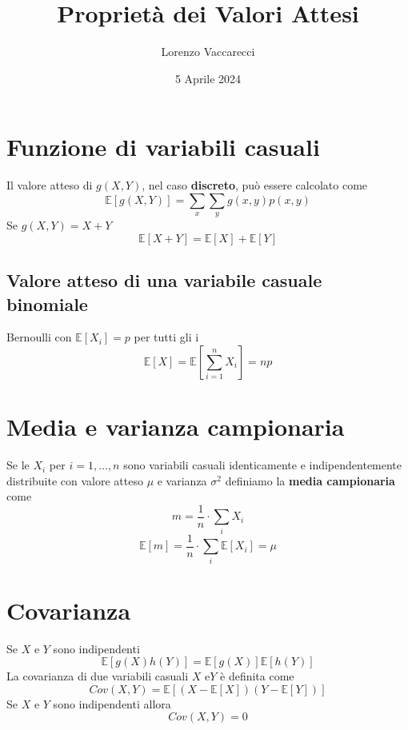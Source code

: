 \documentclass[12pt]{article}
\title{Proprietà dei Valori Attesi}
\author{Lorenzo Vaccarecci}
\date{5 Aprile 2024}
\begin{document}
\maketitle
\section{Funzione di variabili casuali}
Il valore atteso di $g(X,Y)$, nel caso \textbf{discreto}, può essere calcolato come
\begin{equation*}
    \mathbb{E}[g(X,Y)]=\sum_{x}\sum_{y}g(x,y)p(x,y)
\end{equation*}
Se $g(X,Y)=X+Y$
\begin{equation*}
    \mathbb{E}[X+Y]=\mathbb{E}[X]+\mathbb{E}[Y]
\end{equation*}
\subsection{Valore atteso di una variabile casuale binomiale}
Bernoulli con $\mathbb{E}[X_{i}]=p$ per tutti gli i
\begin{equation*}
    \mathbb{E}[X]=\mathbb{E}\left[\sum_{i=1}^{n}X_{i}\right]=np
\end{equation*}
\section{Media e varianza campionaria}
Se le $X_{i}$ per $i=1,\ldots,n$ sono variabili casuali identicamente e indipendentemente distribuite con valore atteso $\mu$ e varianza $\sigma^{2}$ definiamo la \textbf{media campionaria} come
\begin{equation*}
    m = \frac{1}{n}\cdot \sum_{i}X_{i}
\end{equation*}
\begin{equation*}
    \mathbb{E}[m]=\frac{1}{n}\cdot\sum_{i}\mathbb{E}[X_{i}] = \mu
\end{equation*}
\section{Covarianza}
Se $X$ e $Y$ sono indipendenti
\begin{equation*}
    \mathbb{E}[g(X)h(Y)]=\mathbb{E}[g(X)]\mathbb{E}[h(Y)]
\end{equation*}
La covarianza di due variabili casuali $X$ e$Y$ è definita come
\begin{equation*}
    Cov(X,Y)=\mathbb{E}[(X-\mathbb{E}[X])(Y-\mathbb{E}[Y])]
\end{equation*}
Se $X$ e $Y$ sono indipendenti allora
\begin{equation*}
    Cov(X,Y)=0
\end{equation*}
\end{document}
